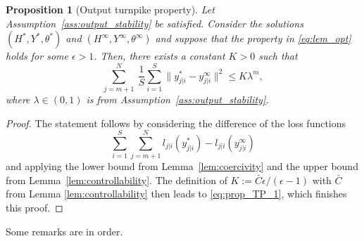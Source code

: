 \documentclass{article} %
\newtheorem{prop}{Proposition}
\begin{document}
\begin{prop}[Output turnpike property]\label{prop:TP}
	Let Assumption~\ref{ass:output_stability} be satisfied.
	Consider the solutions $(H^*,Y^*,\theta^*)$ and $(H^\infty,Y^\infty,\theta^\infty)$ and suppose that the property in \eqref{eq:lem_opt} holds for some $\epsilon>1$. Then, there exists a constant $K>0$ such that
	\begin{equation}\label{eq:prop_TP_1}
	 	\sum_{j=m+1}^{N} \ \frac{1}{S}\sum_{i=1}^{S}\|{y}_{j|i}^*-{y}_{j|i}^\infty\|^2 \leq K\lambda^m,
	\end{equation}
	where $\lambda\in(0,1)$ is from Assumption~\ref{ass:output_stability}.
\end{prop}

\begin{proof}
	The statement follows by considering the difference of the loss functions
	\begin{equation*}
		\sum_{i=1}^{S}\sum_{j=m+1}^{N}l_{j|i}({y}_{j|i}^*)-l_{j|i}({y}^\infty_{j|i})
	\end{equation*}
	 and applying the lower bound from Lemma~\ref{lem:coercivity} and the upper bound from Lemma~\ref{lem:controllability}. The definition of $K:=\bar{C}{\epsilon}/({\epsilon-1})$ with $\bar{C}$ from Lemma \ref{lem:controllability} then leads to \eqref{eq:prop_TP_1}, which finishes this proof.
\end{proof}

Some remarks are in order.
\end{document}
